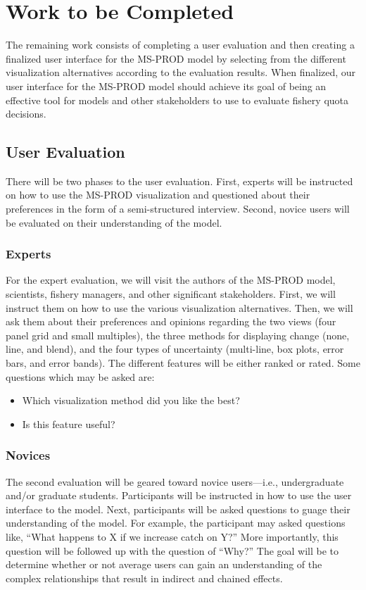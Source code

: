 \chapter{Work to be Completed}

The remaining work consists of completing a user evaluation and then creating a finalized user interface for the MS-PROD model by selecting from the different visualization alternatives according to the evaluation results.  When finalized, our user interface for the MS-PROD model should achieve its goal of being an effective tool for models and other stakeholders to use to evaluate fishery quota decisions.

\section{User Evaluation}

There will be two phases to the user evaluation.  First, experts will be instructed on how to use the MS-PROD visualization and questioned about their preferences in the form of a semi-structured interview.  Second, novice users will be evaluated on their understanding of the model.

\subsection{Experts}

For the expert evaluation, we will visit the authors of the MS-PROD model, scientists, fishery managers, and other significant stakeholders.  First, we will instruct them on how to use the various visualization alternatives.  Then, we will ask them about their preferences and opinions regarding the two views (four panel grid and small multiples), the three methods for displaying change (none, line, and blend), and the four types of uncertainty (multi-line, box plots, error bars, and error bands).  The different features will be either ranked or rated.  Some questions which may be asked are:

\begin{itemize}
  \item Which visualization method did you like the best?
  \item Is this feature useful?
\end{itemize}

\subsection{Novices}

The second evaluation will be geared toward novice users---i.e., undergraduate and/or graduate students.  Participants will be instructed in how to use the user interface to the model.  Next, participants will be asked questions to guage their understanding of the model.  For example, the participant may asked questions like, ``What happens to X if we increase catch on Y?''  More importantly, this question will be followed up with the question of ``Why?''  The goal will be to determine whether or not average users can gain an understanding of the complex relationships that result in indirect and chained effects.
